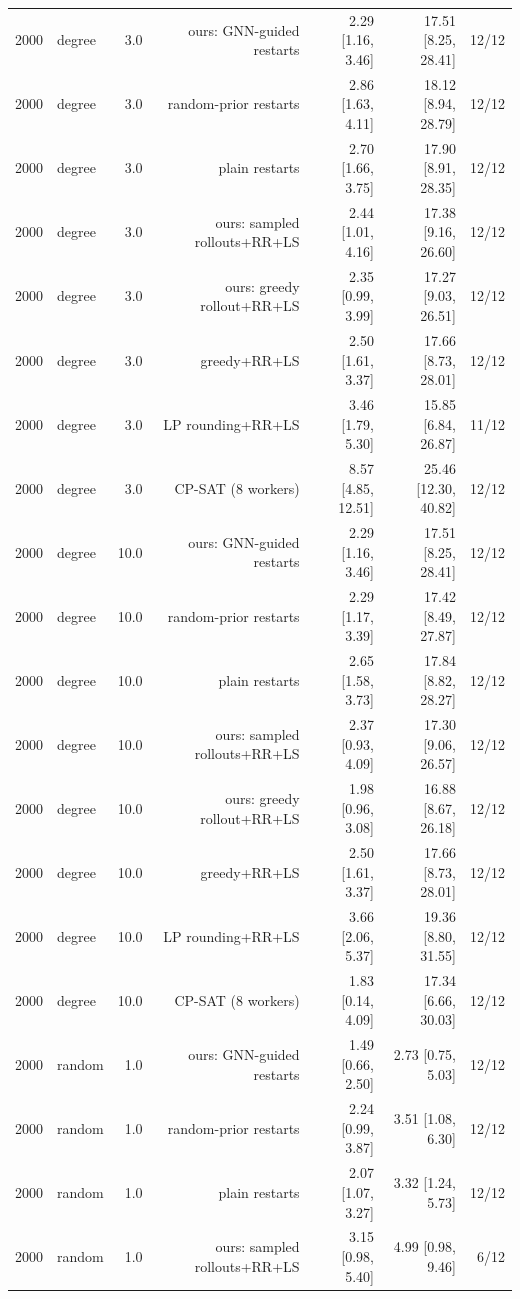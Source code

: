\begin{table}[t]
\begin{tabular}{llrrrrr}
2000 & degree & 3.0 & ours: GNN-guided restarts & 2.29 [1.16, 3.46] & 17.51 [8.25, 28.41] & 12/12 \\
2000 & degree & 3.0 & random-prior restarts & 2.86 [1.63, 4.11] & 18.12 [8.94, 28.79] & 12/12 \\
2000 & degree & 3.0 & plain restarts & 2.70 [1.66, 3.75] & 17.90 [8.91, 28.35] & 12/12 \\
2000 & degree & 3.0 & ours: sampled rollouts+RR+LS & 2.44 [1.01, 4.16] & 17.38 [9.16, 26.60] & 12/12 \\
2000 & degree & 3.0 & ours: greedy rollout+RR+LS & 2.35 [0.99, 3.99] & 17.27 [9.03, 26.51] & 12/12 \\
2000 & degree & 3.0 & greedy+RR+LS & 2.50 [1.61, 3.37] & 17.66 [8.73, 28.01] & 12/12 \\
2000 & degree & 3.0 & LP rounding+RR+LS & 3.46 [1.79, 5.30] & 15.85 [6.84, 26.87] & 11/12 \\
2000 & degree & 3.0 & CP-SAT (8 workers) & 8.57 [4.85, 12.51] & 25.46 [12.30, 40.82] & 12/12 \\
2000 & degree & 10.0 & ours: GNN-guided restarts & 2.29 [1.16, 3.46] & 17.51 [8.25, 28.41] & 12/12 \\
2000 & degree & 10.0 & random-prior restarts & 2.29 [1.17, 3.39] & 17.42 [8.49, 27.87] & 12/12 \\
2000 & degree & 10.0 & plain restarts & 2.65 [1.58, 3.73] & 17.84 [8.82, 28.27] & 12/12 \\
2000 & degree & 10.0 & ours: sampled rollouts+RR+LS & 2.37 [0.93, 4.09] & 17.30 [9.06, 26.57] & 12/12 \\
2000 & degree & 10.0 & ours: greedy rollout+RR+LS & 1.98 [0.96, 3.08] & 16.88 [8.67, 26.18] & 12/12 \\
2000 & degree & 10.0 & greedy+RR+LS & 2.50 [1.61, 3.37] & 17.66 [8.73, 28.01] & 12/12 \\
2000 & degree & 10.0 & LP rounding+RR+LS & 3.66 [2.06, 5.37] & 19.36 [8.80, 31.55] & 12/12 \\
2000 & degree & 10.0 & CP-SAT (8 workers) & 1.83 [0.14, 4.09] & 17.34 [6.66, 30.03] & 12/12 \\
2000 & random & 1.0 & ours: GNN-guided restarts & 1.49 [0.66, 2.50] & 2.73 [0.75, 5.03] & 12/12 \\
2000 & random & 1.0 & random-prior restarts & 2.24 [0.99, 3.87] & 3.51 [1.08, 6.30] & 12/12 \\
2000 & random & 1.0 & plain restarts & 2.07 [1.07, 3.27] & 3.32 [1.24, 5.73] & 12/12 \\
2000 & random & 1.0 & ours: sampled rollouts+RR+LS & 3.15 [0.98, 5.40] & 4.99 [0.98, 9.46] & 6/12 \\

\end{tabular}
\end{table}
